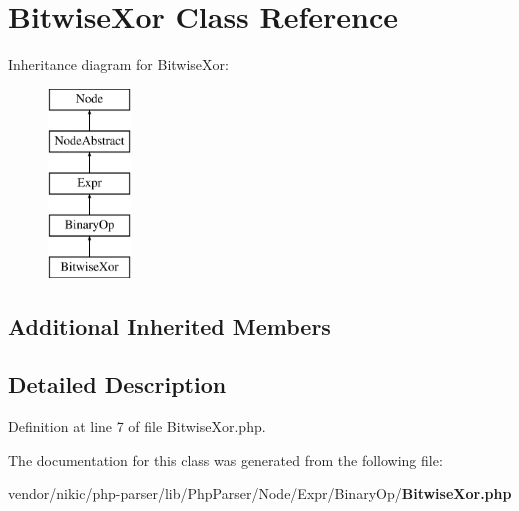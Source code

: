 \section{Bitwise\+Xor Class Reference}
\label{class_php_parser_1_1_node_1_1_expr_1_1_binary_op_1_1_bitwise_xor}
Inheritance diagram for Bitwise\+Xor\+:\begin{figure}[H]
\begin{center}
\leavevmode
\includegraphics[height=5.000000cm]{class_php_parser_1_1_node_1_1_expr_1_1_binary_op_1_1_bitwise_xor}
\end{center}
\end{figure}
\subsection*{Additional Inherited Members}


\subsection{Detailed Description}


Definition at line 7 of file Bitwise\+Xor.\+php.



The documentation for this class was generated from the following file\+:\begin{DoxyCompactItemize}
\item 
vendor/nikic/php-\/parser/lib/\+Php\+Parser/\+Node/\+Expr/\+Binary\+Op/{\bf Bitwise\+Xor.\+php}\end{DoxyCompactItemize}
